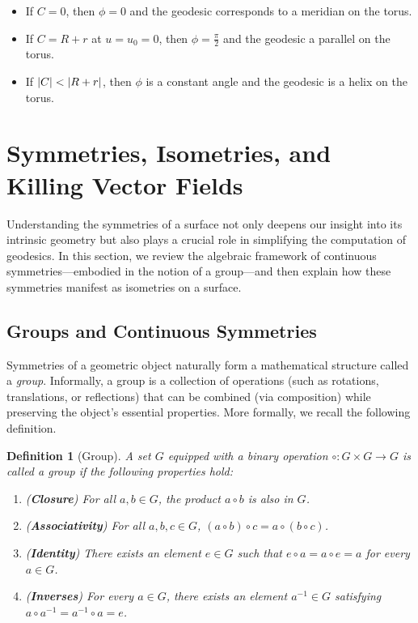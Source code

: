 \documentclass[12pt]{article}
\newtheorem{definition}{Definition}[section]
\begin{document}
\begin{itemize}
    \item If $C = 0$, then $\phi = 0$ and the geodesic corresponds to a meridian on the torus.
    \item If $C = R + r$ at $u = u_0 = 0$, then $\phi = \frac{\pi}{2}$ and the geodesic a parallel on the torus.
    \item If $\abs{C} < \abs{R + r}$, then $\phi$ is a constant angle and the geodesic is a helix on the torus.
\end{itemize}

\section{Symmetries, Isometries, and Killing Vector Fields}

Understanding the symmetries of a surface not only deepens our insight into its intrinsic geometry but also plays a crucial role in simplifying the computation of geodesics. 
In this section, we review the algebraic framework of continuous symmetries—embodied in the notion of a group—and then explain how these symmetries manifest as isometries on a surface. 

\subsection{Groups and Continuous Symmetries}
Symmetries of a geometric object naturally form a mathematical structure called a \emph{group}. 
Informally, a group is a collection of operations (such as rotations, translations, or reflections) that can be combined (via composition) while preserving the object’s essential properties. 
More formally, we recall the following definition.

\begin{definition}[Group]
	A set $G$ equipped with a binary operation $\circ: G \times G \to G$ is called a \emph{group} if the following properties hold:
	\begin{enumerate}
	    \item (\textbf{Closure}) For all $a,b \in G$, the product $a \circ b$ is also in $G$.
	    \item (\textbf{Associativity}) For all $a,b,c \in G$, $(a \circ b) \circ c = a \circ (b \circ c)$.
	    \item (\textbf{Identity}) There exists an element $e \in G$ such that $e \circ a = a \circ e = a$ for every $a \in G$.
	    \item (\textbf{Inverses}) For every $a \in G$, there exists an element $a^{-1} \in G$ satisfying $a \circ a^{-1} = a^{-1} \circ a = e$.
	\end{enumerate}
\end{definition}
\end{document}
